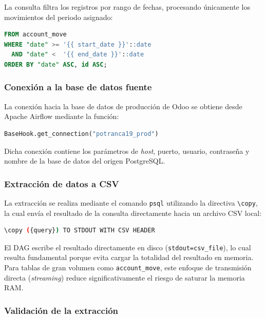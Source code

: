 La consulta filtra los registros por rango de fechas, procesando únicamente los movimientos del periodo asignado:

\begin{lstlisting}[language=SQL, breaklines=true]
FROM account_move
WHERE "date" >= '{{ start_date }}'::date
  AND "date" <  '{{ end_date }}'::date
ORDER BY "date" ASC, id ASC;
\end{lstlisting}

\subsubsection{Conexión a la base de datos fuente}

La conexión hacia la base de datos de producción de Odoo se obtiene desde Apache Airflow mediante la función:

\begin{lstlisting}[language=Python, breaklines=true]
BaseHook.get_connection("potranca19_prod")
\end{lstlisting}

Dicha conexión contiene los parámetros de \textit{host}, puerto, usuario, contraseña y nombre de la base de datos del origen PostgreSQL.

\subsubsection{Extracción de datos a CSV}

La extracción se realiza mediante el comando \texttt{psql} utilizando la directiva \texttt{\textbackslash copy}, la cual envía el resultado de la consulta directamente hacia un archivo CSV local:

\begin{lstlisting}[language=bash, breaklines=true]
\copy ({query}) TO STDOUT WITH CSV HEADER
\end{lstlisting}

El DAG escribe el resultado directamente en disco (\texttt{stdout=csv\_file}), lo cual resulta fundamental porque evita cargar la totalidad del resultado en memoria. Para tablas de gran volumen como \texttt{account\_move}, este enfoque de transmisión directa (\textit{streaming}) reduce significativamente el riesgo de saturar la memoria RAM.

\subsubsection{Validación de la extracción}

